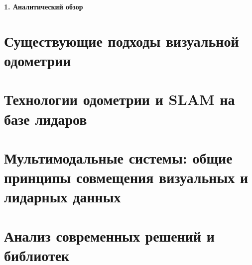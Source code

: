 \newpage
\begin{center}
  \textbf{\large 1. Аналитический обзор }
\end{center}

\section{Существующие подходы визуальной одометрии}
\section{Технологии одометрии и SLAM на базе лидаров}
\section{Мультимодальные системы: общие принципы совмещения визуальных и лидарных данных}
\section{Анализ современных решений и библиотек}